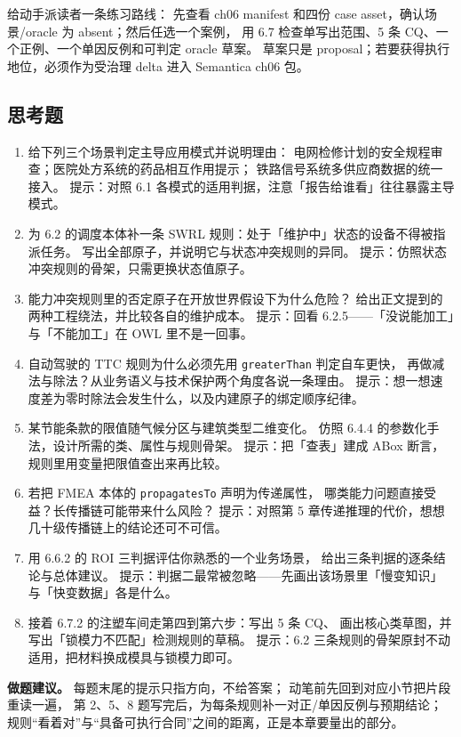 给动手派读者一条练习路线：
先查看 ch06 manifest 和四份 case asset，确认场景/oracle 为 absent；然后任选一个案例，
用 6.7 检查单写出范围、5 条 CQ、一个正例、一个单因反例和可判定 oracle 草案。
草案只是 proposal；若要获得执行地位，必须作为受治理 delta 进入 Semantica ch06 包。

\subsection*{思考题}

\begin{enumerate}
\item 给下列三个场景判定主导应用模式并说明理由：
  电网检修计划的安全规程审查；医院处方系统的药品相互作用提示；
  铁路信号系统多供应商数据的统一接入。
  提示：对照 6.1 各模式的适用判据，注意「报告给谁看」往往暴露主导模式。
\item 为 6.2 的调度本体补一条 SWRL 规则：处于「维护中」状态的设备不得被指派任务。
  写出全部原子，并说明它与状态冲突规则的异同。
  提示：仿照状态冲突规则的骨架，只需更换状态值原子。
\item 能力冲突规则里的否定原子在开放世界假设下为什么危险？
  给出正文提到的两种工程绕法，并比较各自的维护成本。
  提示：回看 6.2.5——「没说能加工」与「不能加工」在 OWL 里不是一回事。
\item 自动驾驶的 TTC 规则为什么必须先用 \texttt{greaterThan} 判定自车更快，
  再做减法与除法？从业务语义与技术保护两个角度各说一条理由。
  提示：想一想速度差为零时除法会发生什么，以及内建原子的绑定顺序纪律。
\item 某节能条款的限值随气候分区与建筑类型二维变化。
  仿照 6.4.4 的参数化手法，设计所需的类、属性与规则骨架。
  提示：把「查表」建成 ABox 断言，规则里用变量把限值查出来再比较。
\item 若把 FMEA 本体的 \texttt{propagatesTo} 声明为传递属性，
  哪类能力问题直接受益？长传播链可能带来什么风险？
  提示：对照第 5 章传递推理的代价，想想几十级传播链上的结论还可不可信。
\item 用 6.6.2 的 ROI 三判据评估你熟悉的一个业务场景，
  给出三条判据的逐条结论与总体建议。
  提示：判据二最常被忽略——先画出该场景里「慢变知识」与「快变数据」各是什么。
\item 接着 6.7.2 的注塑车间走第四到第六步：写出 5 条 CQ、
  画出核心类草图，并写出「锁模力不匹配」检测规则的草稿。
  提示：6.2 三条规则的骨架原封不动适用，把材料换成模具与锁模力即可。
\end{enumerate}

\begin{noteblock}
\textbf{做题建议。}
每题末尾的提示只指方向，不给答案；
动笔前先回到对应小节把片段重读一遍，
第 2、5、8 题写完后，为每条规则补一对正/单因反例与预期结论；
规则“看着对”与“具备可执行合同”之间的距离，正是本章要量出的部分。
\end{noteblock}


